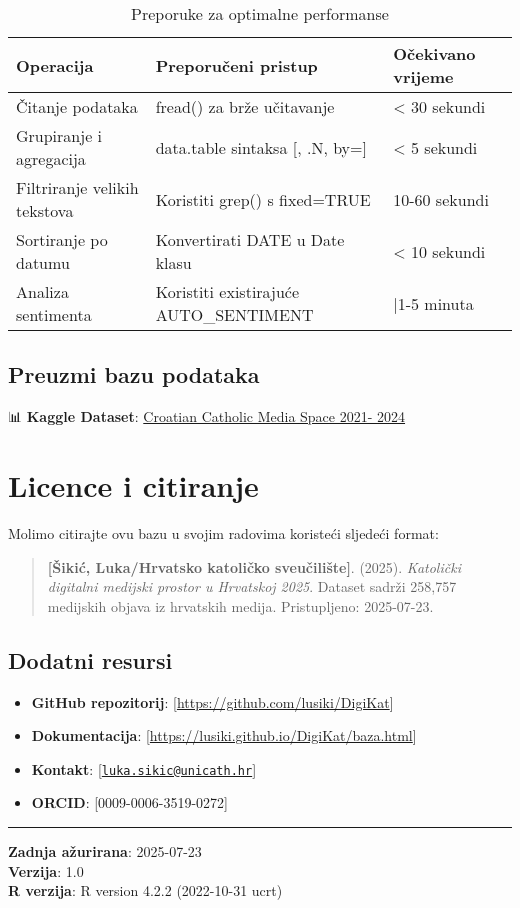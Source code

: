 \documentclass[
]{article}
\providecommand{\tightlist}{%
  \setlength{\itemsep}{0pt}\setlength{\parskip}{0pt}}
\begin{document}
\begin{longtable}[t]{lll}
\caption{\label{tab:performance-notes}Preporuke za optimalne performanse}\\
\toprule
Operacija & Preporučeni pristup & Očekivano vrijeme\\
\midrule
Čitanje podataka & fread() za brže učitavanje & < 30 sekundi\\
Grupiranje i agregacija & data.table sintaksa [, .N, by=] & < 5 sekundi\\
Filtriranje velikih tekstova & Koristiti grep() s fixed=TRUE & 10-60 sekundi\\
Sortiranje po datumu & Konvertirati DATE u Date klasu & < 10 sekundi\\
Analiza sentimenta & Koristiti existirajuće AUTO\_SENTIMENT & |1-5 minuta\\
\bottomrule
\end{longtable}

\subsection{Preuzmi bazu podataka}\label{preuzmi-bazu-podataka}

📊 \textbf{Kaggle Dataset}:
\href{https://www.kaggle.com/datasets/lukasikic/croatian-catholic-digital-media-space/data1}{Croatian
Catholic Media Space 2021- 2024}

\section{Licence i citiranje}\label{licence-i-citiranje}

Molimo citirajte ovu bazu u svojim radovima koristeći sljedeći format:

\begin{quote}
\textbf{{[}Šikić, Luka/Hrvatsko katoličko sveučilište{]}}. (2025).
\emph{Katolički digitalni medijski prostor u Hrvatskoj 2025}. Dataset
sadrži 258,757 medijskih objava iz hrvatskih medija. Pristupljeno:
2025-07-23.
\end{quote}

\subsection{Dodatni resursi}\label{dodatni-resursi}

\begin{itemize}
\tightlist
\item
  \textbf{GitHub repozitorij}:
  {[}\url{https://github.com/lusiki/DigiKat}{]}
\item
  \textbf{Dokumentacija}:
  {[}\url{https://lusiki.github.io/DigiKat/baza.html}{]}
\item
  \textbf{Kontakt}:
  {[}\href{mailto:luka.sikic@unicath.hr}{\nolinkurl{luka.sikic@unicath.hr}}{]}
\item
  \textbf{ORCID}: {[}0009-0006-3519-0272{]}
\end{itemize}

\begin{center}\rule{0.5\linewidth}{0.5pt}\end{center}

\textbf{Zadnja ažurirana}: 2025-07-23\\
\textbf{Verzija}: 1.0\\
\textbf{R verzija}: R version 4.2.2 (2022-10-31 ucrt)
\end{document}
